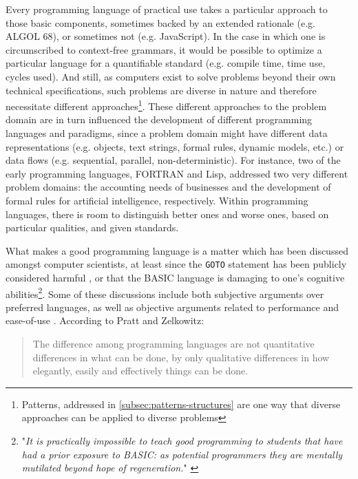 Every programming language of practical use takes a particular approach to those basic components, sometimes backed by an extended rationale (e.g. ALGOL 68), or sometimes not (e.g. JavaScript). In the case in which one is circumscribed to context-free grammars, it would be possible to optimize a particular language for a quantifiable standard (e.g. compile time, time use, cycles used). And still, as computers exist to solve problems beyond their own technical specifications, such problems are diverse in nature and therefore necessitate different approaches\footnote{Patterns, addressed in \autoref{subsec:patterns-structures} are one way that diverse approaches can be applied to diverse problems}. These different approaches to the problem domain are in turn influenced the development of different programming languages and paradigms, since a problem domain might have different data representations (e.g. objects, text strings, formal rules, dynamic models, etc.) or data flows (e.g. sequential, parallel, non-deterministic). For instance, two of the early programming languages, FORTRAN and Lisp, addressed two very different problem domains: the accounting needs of businesses and the development of formal rules for artificial intelligence, respectively. Within programming languages, there is room to distinguish better ones and worse ones, based on particular qualities, and given standards.

What makes a good programming language is a matter which has been discussed amongst computer scientists, at least since the \lstinline{GOTO} statement has been publicly considered harmful \citep{dijkstra_letters_1968}, or that the BASIC language is damaging to one's cognitive abilities\footnote{"\emph{It is practically impossible to teach good programming to students that have had a prior exposure to BASIC: as potential programmers they are mentally mutilated beyond hope of regeneration.}" \citep{dijkstra_how_1975}}. Some of these discussions include both subjective arguments over preferred languages, as well as objective arguments related to performance and ease-of-use \citep{gannon_impact_1975}. According to Pratt and Zelkowitz:

\begin{quote}
  The difference among programming languages are not quantitative differences in what can be done, by only qualitative differences in how elegantly, easily and effectively things can be done. \citep{pratt_programming_2000}
\end{quote}

